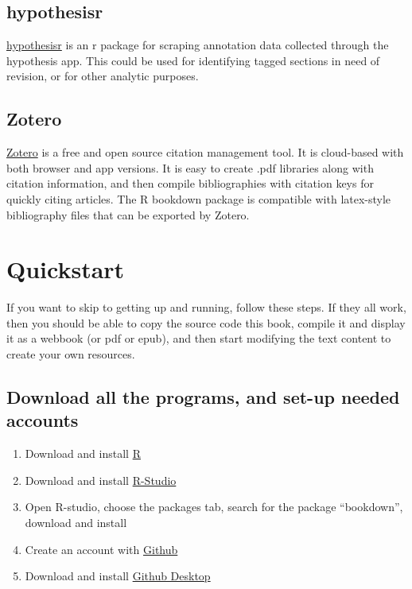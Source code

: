 \documentclass[]{book}
\providecommand{\tightlist}{%
  \setlength{\itemsep}{0pt}\setlength{\parskip}{0pt}}
\theoremstyle{definition}
\theoremstyle{definition}
\theoremstyle{definition}
\theoremstyle{remark}
\begin{document}
\subsection{hypothesisr}\label{hypothesisr}

\href{https://github.com/mdlincoln/hypothesisr}{hypothesisr} is an r
package for scraping annotation data collected through the hypothesis
app. This could be used for identifying tagged sections in need of
revision, or for other analytic purposes.

\subsection{Zotero}\label{zotero}

\href{https://www.zotero.org}{Zotero} is a free and open source citation
management tool. It is cloud-based with both browser and app versions.
It is easy to create .pdf libraries along with citation information, and
then compile bibliographies with citation keys for quickly citing
articles. The R bookdown package is compatible with latex-style
bibliography files that can be exported by Zotero.

\section{Quickstart}\label{quickstart}

If you want to skip to getting up and running, follow these steps. If
they all work, then you should be able to copy the source code this
book, compile it and display it as a webbook (or pdf or epub), and then
start modifying the text content to create your own resources.

\subsection{Download all the programs, and set-up needed
accounts}\label{download-all-the-programs-and-set-up-needed-accounts}

\begin{enumerate}
\def\labelenumi{\arabic{enumi}.}
\tightlist
\item
  Download and install \href{https://www.r-project.org}{R}
\item
  Download and install \href{https://www.rstudio.com}{R-Studio}
\item
  Open R-studio, choose the packages tab, search for the package
  ``bookdown'', download and install
\item
  Create an account with \href{http://www.github.com}{Github}
\item
  Download and install \href{(https://desktop.github.com)}{Github
  Desktop}
\end{enumerate}
\end{document}
